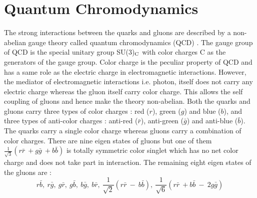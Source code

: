 \section{Quantum Chromodynamics}
The strong interactions between the quarks and gluons are described by a non-abelian gauge theory called quantum chromodynamics (QCD) \cite{Ellis:1991qj, Halzen:1984mc}. The gauge group of QCD is the special unitary group SU(3)$_{\rm C}$ with color charges C as the generators of the gauge group. Color charge is the peculiar property of QCD and has a same role as the electric charge in electromagnetic interactions. However, the mediator of electromagnetic interactions i.e. photon, itself does not carry any electric charge whereas the gluon itself carry color charge. This allows the self coupling of gluons and hence make the theory non-abelian. Both the quarks and gluons carry three types of color charges : red ($r$), green ($g$) and blue ($b$), and three types of anti-color charges : anti-red ($\bar{r}$), anti-green ($\bar{g}$) and anti-blue ($\bar{b}$). The quarks carry a single color charge whereas gluons carry a combination of color charges. There are nine eigen states of gluons but one of them $\frac{1}{\sqrt{3}}(r\bar{r}~\plus g\bar{g}~\plus b\bar{b})$ is totally symmetric color singlet which has no net color charge and does not take part in interaction. The remaining eight eigen states of the gluons are :
\begin{equation}
r\bar{b},~r\bar{g},~g\bar{r},~g\bar{b},~b\bar{g},~b\bar{r},~\frac{1}{\sqrt{2}}(r\bar{r}~-~b\bar{b}),~\frac{1}{\sqrt{6}}(r\bar{r}~\plus b\bar{b}~-~2g\bar{g}) 
\end{equation}


